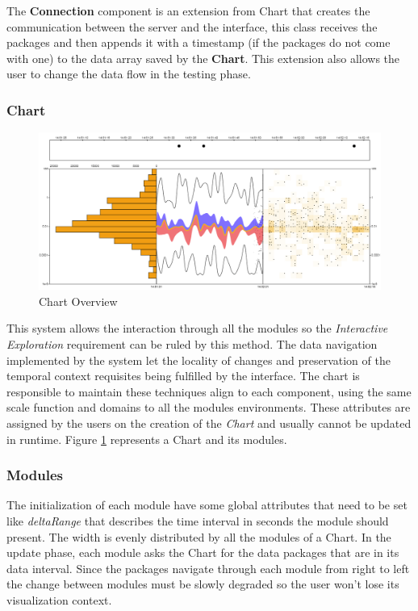 \documentclass[letterpaper, 10 pt, conference]{ieeeconf}  %
\begin{document}
The \textbf{Connection} component is an extension from Chart that creates the communication between the server and the interface, this class receives the packages and then appends it with a timestamp (if the packages do not come with one) to the data array saved by the \textbf{Chart}. This extension also allows the user to change the data flow in the testing phase.



\subsubsection{Chart}
\label{subsubsection:chart}

\begin{figure}[ht]
    \centering
  \includegraphics[width=\linewidth]{Figures/chart.png}
  \caption{Chart Overview}
  \label{fig:chart}
\end{figure}

This system allows the interaction through all the modules so the \textit{Interactive Exploration} requirement can be ruled by this method. The data navigation implemented by the system let the locality of changes and preservation of the temporal context requisites being fulfilled by the interface.\newline
The chart is responsible to maintain these techniques align to each component, using the same scale function and domains to all the modules environments. These attributes are assigned by the users on the creation of the \textit{Chart} and usually cannot be updated in runtime. Figure \ref{fig:chart} represents a Chart and its modules.

\subsubsection{Modules}
\label{subsubsection:modules}
The initialization of each module have some global attributes that need to be set like \textit{deltaRange} that describes the time interval in seconds the module should present. The width is evenly distributed by all the modules of a Chart. In the update phase, each module asks the Chart for the data packages that are in its data interval. Since the packages navigate through each module from right to left the change between modules must be slowly degraded so the user won't lose its visualization context.
\end{document}
